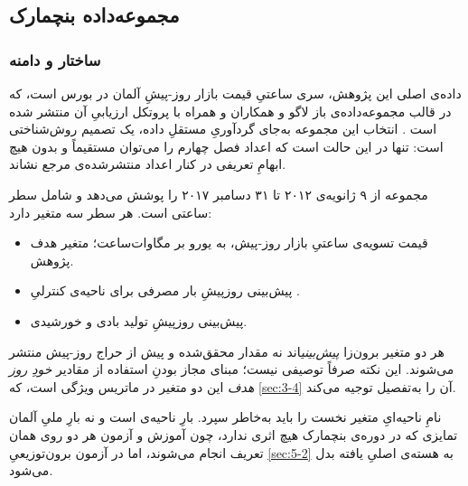 
\subsection{مجموعه‌داده بنچمارک }
\label{sec:3-3-1}

\subsubsection*{ساختار و دامنه}

داده‌ی اصلی این پژوهش، سری ساعتیِ قیمت بازار روز-پیشِ آلمان در بورس  است،
که در قالب مجموعه‌داده‌ی باز لاگو و همکاران و همراه با پروتکل ارزیابیِ آن منتشر شده
است \cite{lago_forecasting_2021}. انتخاب این مجموعه به‌جای گردآوریِ مستقلِ داده، یک
تصمیم روش‌شناختی است: تنها در این حالت است که اعداد فصل چهارم را می‌توان مستقیماً و
بدون هیچ ابهامِ تعریفی در کنار اعداد منتشرشده‌ی مرجع نشاند.

مجموعه از ۹ ژانویه‌ی ۲۰۱۲ تا ۳۱ دسامبر ۲۰۱۷ را پوشش می‌دهد و شامل  سطر ساعتی
است. هر سطر سه متغیر دارد:

\begin{itemize}
  \item {}  قیمت تسویه‌ی ساعتیِ بازار روز-پیش، به یورو بر مگاوات‌ساعت؛
        متغیر هدف پژوهش.
  \item {}  پیش‌بینی روزپیشِ بار مصرفی برای ناحیه‌ی کنترلیِ
        .
  \item {}  پیش‌بینی روزپیشِ تولید بادی و خورشیدی.
\end{itemize}

هر دو متغیر برون‌زا \emph{پیش‌بینی}اند  نه مقدار محقق‌شده  و پیش از حراج روز-پیش
منتشر می‌شوند. این نکته صرفاً توصیفی نیست؛ مبنای مجاز بودنِ استفاده از مقادیر
\emph{خودِ روز هدف} این دو متغیر در ماتریس ویژگی است، که \cref{sec:3-4} آن را به‌تفصیل
توجیه می‌کند.

نامِ ناحیه‌ایِ متغیر نخست را باید به‌خاطر سپرد.  بارِ ناحیه‌ی
 است و نه بارِ ملیِ آلمان  تمایزی که در دوره‌ی بنچمارک هیچ اثری
ندارد، چون آموزش و آزمون هر دو روی همان تعریف انجام می‌شوند، اما در آزمون
برون‌توزیعیِ \cref{sec:5-2} به هسته‌ی اصلیِ یافته بدل می‌شود.

